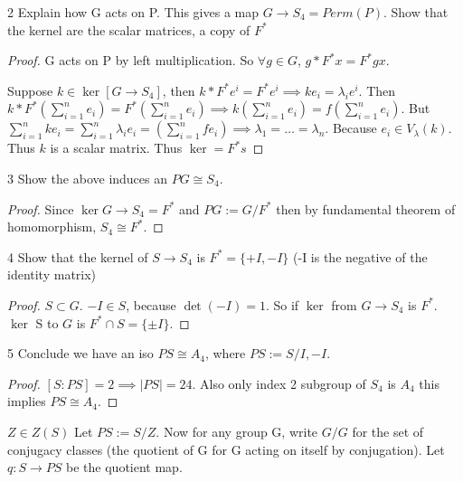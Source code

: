 \documentclass{article}
\begin{document}
\begin{PROB}{2}\label{Problem 2.}
    Explain how G acts on P. This gives a map $G \to S_4 = Perm(P)$. Show that the kernel are the scalar matrices, a copy of $F^*$
\end{PROB}
\begin{proof}
    G acts on P by left multiplication. So $\forall g \in G$, $g * F^*x= F^*gx$. 

    Suppose $k \in \ker[G \to S_4]$, then $k * F^*e^i = F^*e^i \implies ke_i = \lambda_ie^i$. Then $k *F^*(\sum_{i = 1}^{n}e_i) = F^*(\sum_{i = 1}^{n}e_i) \implies k(\sum_{i = 1}^{n}e_i) = f(\sum_{i = 1}^{n}e_i)$. But $\sum_{i = 1}^{n}ke_i = \sum_{i = 1}^{n}\lambda_ie_i = (\sum_{i = 1}^{n}fe_i) \implies \lambda_1 = \ldots = \lambda_n$. Because $e_i \in V_\lambda(k)$. Thus $k$ is a scalar matrix. Thus $\ker = F^*s$
\end{proof}

\bigskip

\begin{PROB}{3}\label{Problem 3.}
    Show the above induces an $PG \cong S_4$. 
\end{PROB}
\begin{proof}
    Since $\ker G \to S_4 = F^*$ and $PG := G/F^*$ then by fundamental theorem of homomorphism, $S_4 \cong F^*$.
\end{proof}

\bigskip

\begin{PROB}{4}\label{Problem 4.}
    Show that the kernel of $S \to S_4$ is $F^* = \{+I,-I\}$ (-I is the negative of the identity matrix)
\end{PROB}
\begin{proof}
    $S \subset G$. $-I \in S$, because $\det(-I) = 1$. So if $\ker$ from $G \to S_4$ is $F^*$. $\ker$ S to $G$ is $F^* \cap S = \{\pm I\}$. 
\end{proof}

\bigskip

\begin{PROB}{5}\label{Problem 5.}
    Conclude we have an iso $PS \cong A_4$, where $PS := S/{I,-I}$. 
\end{PROB}
\begin{proof}
    $[S : PS] = 2\implies |PS| = 24$. Also only index 2 subgroup of $S_4$ is $A_4$ this implies $PS \cong A_4$.
\end{proof}

\bigskip


$Z \in Z(S)$
Let $PS := S/Z$. Now for any group G, write $G/G$ for the set of conjugacy classes
(the quotient of G for G acting on itself by conjugation). Let $q: S \to PS$ be the quotient map. 
\end{document}
